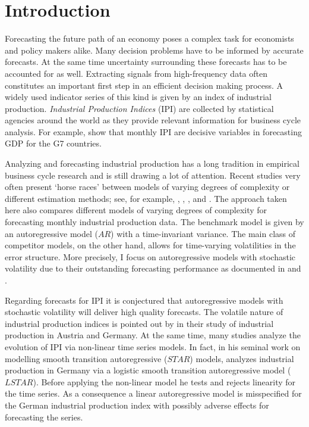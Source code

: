 \documentclass[12pt,letterpaper,fleqn]{article}           %
\begin{document}
\clearpage
\onehalfspacing

\section{Introduction}\label{sec:Introduction}

Forecasting the future path of an economy poses a complex task for economists and policy makers alike. Many decision problems have to be informed by accurate forecasts. At the same time uncertainty surrounding these forecasts has to be accounted for as well. Extracting signals from high-frequency data often constitutes an important first step in an efficient decision making process. A widely used indicator series of this kind is given by an index of industrial production. \textit{Industrial Production Indices} (IPI) are collected by statistical agencies around the world as they provide relevant information for business cycle analysis. %
For example, \textcite{golinelli07} show that monthly IPI are decisive variables in forecasting GDP for the G7 countries.

Analyzing and forecasting industrial production has a long tradition in empirical business cycle research and is still drawing a lot of attention. Recent studies very often present `horse races' between models of varying degrees of complexity or different estimation methods; see, for example, \textcite{avd18}, \textcite{bulligan10}, \textcite{dijk03}, \textcite{silva18} and \textcite{ter05}. The approach taken here also compares different models of varying degrees of complexity for forecasting monthly industrial production data.
The benchmark model is given by an autoregressive model ($AR$) with a time-invariant variance. The main class of competitor models, on the other hand, allows for time-varying volatilities in the error structure. More precisely, I focus on autoregressive models with stochastic volatility due to their outstanding forecasting performance as documented in \textcite{alessandri17} and \textcite{clark15}. 

Regarding forecasts for IPI it is conjectured that autoregressive models with stochastic volatility will deliver high quality forecasts. The volatile nature of industrial production indices is pointed out by \textcite{thury98} in their study of industrial production in Austria and Germany. At the same time, many studies analyze the evolution of IPI via non-linear time series models. In fact, in his seminal work on modelling smooth transition autoregressive ($STAR$) models, \textcite{ter94} analyzes industrial production in Germany via a logistic smooth transition autoregressive model ($LSTAR$). Before applying the non-linear model he tests and rejects linearity for the time series. As a consequence a linear autoregressive model is misspecified for the German industrial production index with possibly adverse effects for forecasting the series. 
\end{document}
